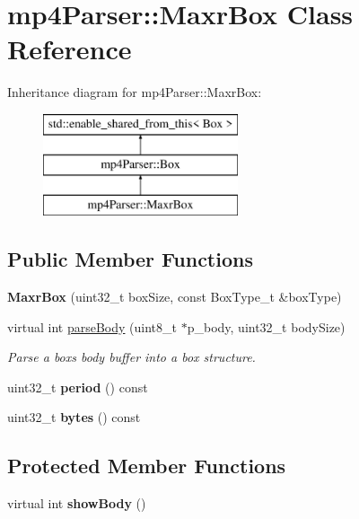 \hypertarget{classmp4_parser_1_1_maxr_box}{}\section{mp4\+Parser\+::Maxr\+Box Class Reference}
\label{classmp4_parser_1_1_maxr_box}
Inheritance diagram for mp4\+Parser\+::Maxr\+Box\+:\begin{figure}[H]
\begin{center}
\leavevmode
\includegraphics[height=3.000000cm]{classmp4_parser_1_1_maxr_box}
\end{center}
\end{figure}
\subsection*{Public Member Functions}
\begin{DoxyCompactItemize}
\item 
\mbox{\label{classmp4_parser_1_1_maxr_box_adc0f4012b426e26d37fb6c16f88d4137}} 
{\bfseries Maxr\+Box} (uint32\+\_\+t box\+Size, const Box\+Type\+\_\+t \&box\+Type)
\item 
virtual int \mbox{\hyperlink{classmp4_parser_1_1_maxr_box_a3a949e14defbdc89190b1dfc0509f3ad}{parse\+Body}} (uint8\+\_\+t $\ast$p\+\_\+body, uint32\+\_\+t body\+Size)
\begin{DoxyCompactList}\small\item\em Parse a box\textquotesingle{}s body buffer into a box structure. \end{DoxyCompactList}\item 
\mbox{\label{classmp4_parser_1_1_maxr_box_a8396fc2a455cd4806eed1f2e00ad497d}} 
uint32\+\_\+t {\bfseries period} () const
\item 
\mbox{\label{classmp4_parser_1_1_maxr_box_a3ada821f2f83f67fcc62e0477303f9c3}} 
uint32\+\_\+t {\bfseries bytes} () const
\end{DoxyCompactItemize}
\subsection*{Protected Member Functions}
\begin{DoxyCompactItemize}
\item 
\mbox{\label{classmp4_parser_1_1_maxr_box_ad5f29aaaf1bca86a5ee97c9aa153db5b}} 
virtual int {\bfseries show\+Body} ()
\end{DoxyCompactItemize}
